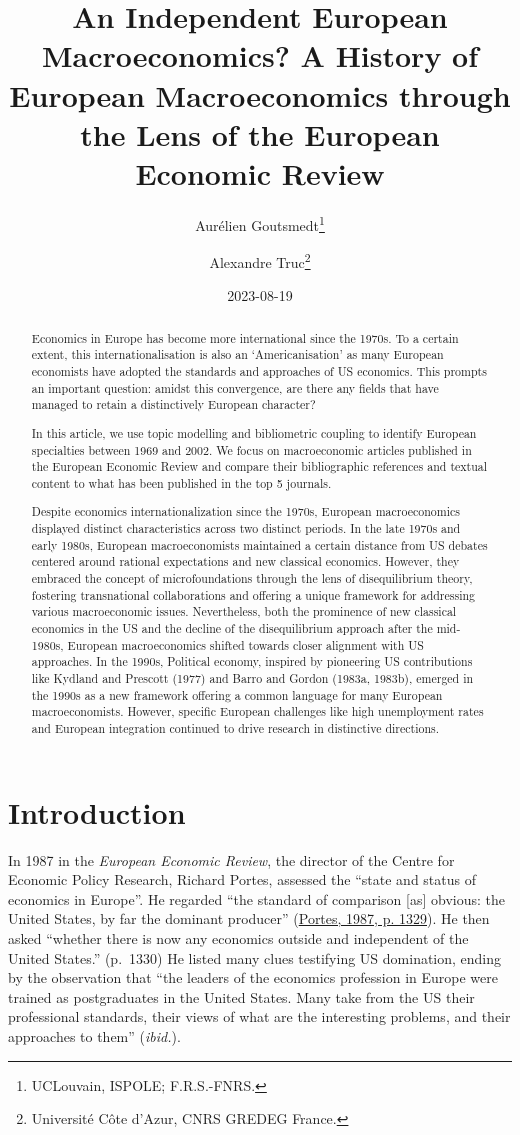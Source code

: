 \documentclass[
  12pt,
  onecolumn]{article}
\title{An Independent European Macroeconomics? A History of European Macroeconomics through the Lens of the European Economic Review}
\author{Aurélien Goutsmedt\footnote{UCLouvain, ISPOLE; F.R.S.-FNRS.} \and Alexandre Truc\footnote{Université Côte d'Azur, CNRS GREDEG France.}}
\date{2023-08-19}
\begin{document}
\maketitle
\begin{abstract}
Economics in Europe has become more international since the 1970s. To a certain extent, this internationalisation is also an `Americanisation' as many European economists have adopted the standards and approaches of US economics. This prompts an important question: amidst this convergence, are there any fields that have managed to retain a distinctively European character?

In this article, we use topic modelling and bibliometric coupling to identify European specialties between 1969 and 2002. We focus on macroeconomic articles published in the European Economic Review and compare their bibliographic references and textual content to what has been published in the top 5 journals.

Despite economics internationalization since the 1970s, European macroeconomics displayed distinct characteristics across two distinct periods. In the late 1970s and early 1980s, European macroeconomists maintained a certain distance from US debates centered around rational expectations and new classical economics. However, they embraced the concept of microfoundations through the lens of disequilibrium theory, fostering transnational collaborations and offering a unique framework for addressing various macroeconomic issues.
Nevertheless, both the prominence of new classical economics in the US and the decline of the disequilibrium approach after the mid-1980s, European macroeconomics shifted towards closer alignment with US approaches. In the 1990s, Political economy, inspired by pioneering US contributions like Kydland and Prescott (1977) and Barro and Gordon (1983a, 1983b), emerged in the 1990s as a new framework offering a common language for many European macroeconomists. However, specific European challenges like high unemployment rates and European integration continued to drive research in distinctive directions.
\end{abstract}

\hypertarget{introduction}{%
\section{Introduction}\label{introduction}}

In 1987 in the \emph{European Economic Review}, the director of the Centre for Economic Policy Research, Richard Portes, assessed the ``state and status of economics in Europe''. He regarded ``the standard of comparison {[}as{]} obvious: the United States, by far the dominant producer'' (\protect\hyperlink{ref-portes1987}{Portes, 1987, p. 1329}). He then asked ``whether there is now any economics outside and independent of the United States.'' (p.~1330) He listed many clues testifying US domination, ending by the observation that ``the leaders of the economics profession in Europe were trained as postgraduates in the United States. Many take from the US their professional standards, their views of what are the interesting problems, and their approaches to them'' (\emph{ibid.}).
\end{document}

